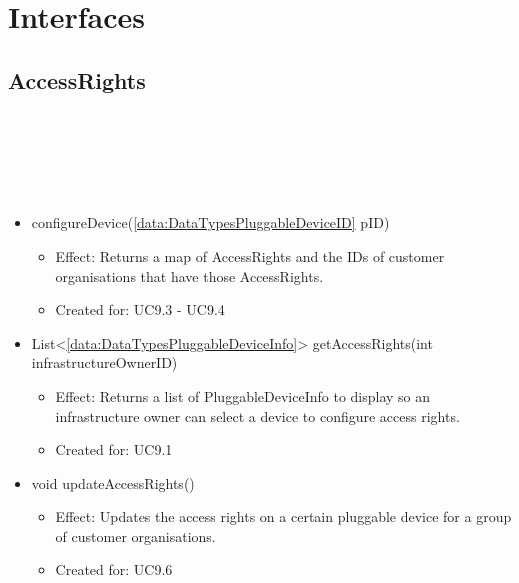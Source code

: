 
\section{Interfaces} \label{sec:interfaces}
  \subsection{AccessRights}\label{int:OnlineServiceOnlineServiceInfrastructureOwnerFacadeAccessRights}
    \begin{description}
      \item[Provided by:] \iconcomponent{}~
      \item[Required by:] \iconcomponent{}~
      \item[Operations:] ~
    \begin{itemize}[noitemsep,nolistsep,leftmargin=-.25cm]
      \item \textsf{ configureDevice(\ref{data:DataTypesPluggableDeviceID} pID)}
        \begin{itemize}[noitemsep,nolistsep]
           \item Effect: Returns a map of AccessRights and the IDs of customer organisations that have those AccessRights.
\item Created for: UC9.3 - UC9.4
        \end{itemize}
      \item \textsf{List\textless{}\ref{data:DataTypesPluggableDeviceInfo}\textgreater{} getAccessRights(int infrastructureOwnerID)}
        \begin{itemize}[noitemsep,nolistsep]
           \item Effect: Returns a list of PluggableDeviceInfo to display so an infrastructure owner can select a device to configure access rights.
\item Created for: UC9.1
        \end{itemize}
      \item \textsf{void updateAccessRights()}
        \begin{itemize}[noitemsep,nolistsep]
           \item Effect: Updates the access rights on a certain pluggable device for a group of customer organisations.
\item Created for: UC9.6
        \end{itemize}
    \end{itemize}
    \end{description}

